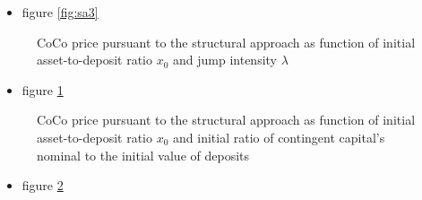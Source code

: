   \begin{itemize}
  \item figure \ref{fig:sa3}
  \end{itemize}

\begin{figure}[H]
\centering
    \caption[CoCo price pursuant to the structural approach as function of asset-to-deposit ratio and jump intensity]{CoCo price pursuant to the structural approach as function of initial asset-to-deposit ratio $x_0$ and jump intensity $\lambda$}
  \label{fig:sa4}
  \end{figure}
  
  \begin{itemize}
  \item figure \ref{fig:sa4}
  \end{itemize}

\begin{figure}[H]
\centering
    \caption[CoCo price pursuant to the structural approach as function of asset-to-deposit ratio and initial ratio of contingent capital's nominal to deposits]{CoCo price pursuant to the structural approach as function of initial asset-to-deposit ratio $x_0$ and initial ratio of contingent capital's nominal to the initial value of deposits}
  \label{fig:sa5}
  \end{figure}

  \begin{itemize}
  \item figure \ref{fig:sa5}
  \end{itemize}

